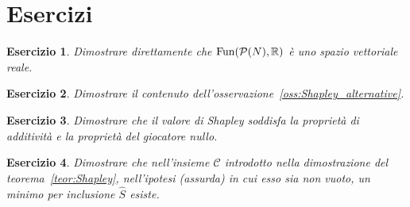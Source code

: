 \documentclass[a4paper,11pt]{article}
\theoremstyle{definition}				%
\theoremstyle{remark}
\theoremstyle{plain}
\newtheorem{esercizio}{Esercizio}%
\newcommand{\R}{\mathbb{R}}										%
\begin{document}
	\section*{Esercizi}
	\begin{esercizio}
		Dimostrare direttamente che $\mathrm{Fun}\qty(\mathcal{P}(N),\R)$ è uno spazio vettoriale reale.
	\end{esercizio}
	\begin{esercizio}
		Dimostrare il contenuto dell'osservazione~\ref{oss:Shapley_alternative}.
	\end{esercizio}
	\begin{esercizio}\label{es:propr_Shapley}
		Dimostrare che il valore di Shapley soddisfa la proprietà di additività e la proprietà del giocatore nullo.
	\end{esercizio} 
    \begin{esercizio}
        Dimostrare che nell'insieme $\mathscr{C}$ introdotto nella dimostrazione del teorema~\ref{teor:Shapley}, nell'ipotesi (assurda) in cui esso sia non vuoto, un minimo per inclusione $\hat{S}$ esiste. 
    \end{esercizio}
\end{document}
